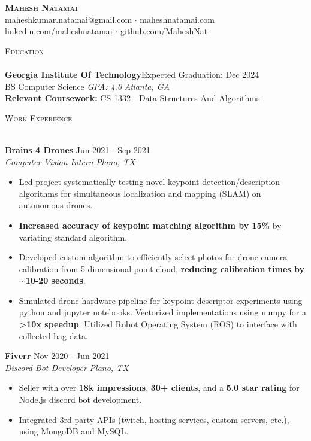\documentclass[a4paper]{article}
\newcommand{\lineunder} {
    \vspace*{-8pt} \\
    \hspace*{-18pt} \hrulefill \\
}
\newcommand{\header} [1] {
    {\hspace*{-18pt}\vspace*{6pt} \textsc{#1}}
    \vspace*{-6pt} \lineunder
}
\begin{document}
\vspace*{-40pt}

    

\vspace*{-10pt}
\begin{center}
	\textbf{\Huge \scshape {Mahesh Natamai}} \\
	maheshkumar.natamai@gmail.com $\cdot$ maheshnatamai.com \\ linkedin.com/maheshnatamai $\cdot$ github.com/MaheshNat\\
\end{center}

\header{Education}
\textbf{Georgia Institute Of Technology}\hfill  Expected Graduation: Dec 2024\\
BS Computer Science \textit{GPA: 4.0} \hfill \textit{Atlanta, GA} \\ 
\vspace{1mm} 
\textbf{Relevant Coursework:}
 CS 1332 - Data Structures And Algorithms\\
\vspace{1mm} 

\header{Work Experience}
\vspace{1mm}

\textbf{Brains 4 Drones} \hfill Jun 2021 - Sep 2021\\
\textit{Computer Vision Intern} \hfill \textit{Plano, TX} \\
\vspace{-1mm}
\begin{itemize} \itemsep -1pt
	\item Led project systematically testing novel keypoint detection/description algorithms for simultaneous localization and mapping (SLAM) on autonomous drones.
	\item \textbf{Increased accuracy of keypoint matching algorithm by 15\%} by variating standard algorithm.
        \item Developed custom algorithm to efficiently select photos for drone camera calibration from 5-dimensional point cloud, \textbf{reducing calibration times by $\sim{}$10-20 seconds}.
	\item Simulated drone hardware pipeline for keypoint descriptor experiments using python and jupyter notebooks. Vectorized implementations using numpy for a \textbf{>10x speedup}. Utilized Robot Operating System (ROS) to interface with collected bag data.
\end{itemize}
\textbf{Fiverr} \hfill Nov 2020 - Jun 2021\\
\textit{Discord Bot Developer} \hfill \textit{Plano, TX} \\
\vspace{-1mm}
\begin{itemize} \itemsep -1pt
	\item Seller with over \textbf{18k impressions}, \textbf{30+ clients}, and a \textbf{5.0 star rating} for Node.js discord bot development.
	\item Integrated 3rd party APIs (twitch, hosting services, custom servers, etc.), using MongoDB and MySQL.
\end{itemize}
\end{document}
